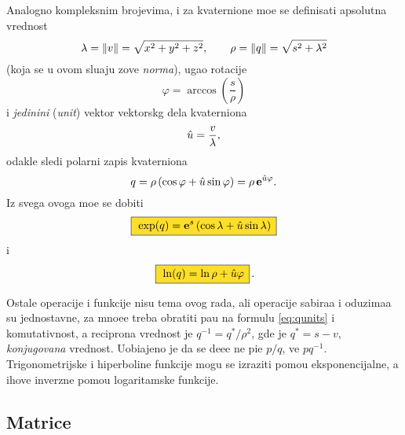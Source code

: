 Analogno kompleksnim brojevima, i za kvaternione mo{\zv}e se definisati apsolutna vrednost
$$
\lambda = {\Vert v\Vert} = \sqrt{x^2+y^2+z^2},\qquad
\rho = {\Vert q\Vert} = \sqrt{s^2+\lambda^2}
$$
(koja se u ovom slu{\cv}aju zove {\sl norma\/}),
ugao rotacije
$$
\varphi = \arccos\left( \frac s\rho \right)
$$
i {\sl jedini{\cv}ni\/} ({\sl unit\/}) vektor vektorskg dela kvaterniona
$$
{\hat u} = \frac v\lambda,
$$
odakle sledi polarni zapis kvaterniona
\begin{equation}
    q
=\rho\,(\cos\varphi + {\hat u}\sin\varphi)
=\rho\,{\bf e}^{{\hat u}\varphi}.
\end{equation}
Iz svega ovoga mo{\zv}e se dobiti
\begin{equation}
    \okvir{\exp(q) = \e^s \left( \cos\lambda + \uv\sin\lambda \right)}
\end{equation}
i
\begin{equation}
    \okvir{\ln(q)  = \ln\rho + \uv\varphi}.
\end{equation}

\medskip

\danger
Ostale operacije i funkcije nisu tema ovog rada, ali operacije sabira{\nj}a i oduzima{\nj}a
su jednostavne, za mno{\zv}e{\nj}e treba obratiti pa{\zv}{\nj}u na formulu \eqref{eq:qunits} i
komutativnost, a recipro{\cv}na vrednost je
$q^{-1}={q^*}/\rho^2$, gde je ${q^*}=s-v$, {\sl konjugovana\/} vrednost. 
Uobi{\cv}ajeno je da se de{\lj}e{\nj}e ne pi{\sv}e $p/q$, ve{\cc} $pq^{-1}$.
Trigonometrijske i hiperboli{\cv}ne funkcije mogu se izraziti pomo{\cc}u eksponencijalne,
a {\nj}ihove inverzne pomo{\cc}u logaritamske funkcije.


\newpage

\subsection{Matrice}

\newpage
